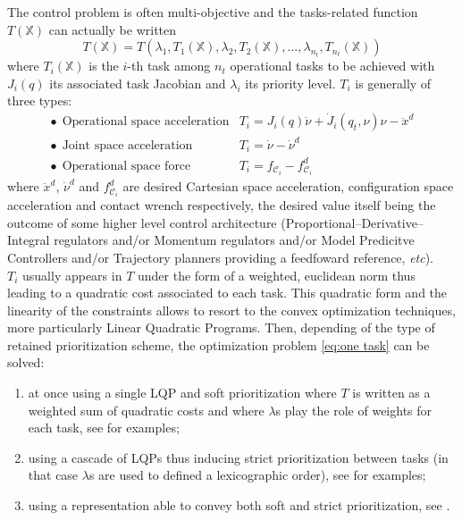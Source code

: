 \documentclass[12pt,a4paper,twoside]{article}
\begin{document}
The control problem is often multi-objective and the tasks-related function $T(\mathbb{X})$ can actually be written
\begin{equation}\label{eq:multi task}
T(\mathbb{X}) = T\left(\lambda_1, T_1(\mathbb{X}), \lambda_2, T_2(\mathbb{X}), \dots, \lambda_{n_t},T_{n_t}(\mathbb{X})\right)
\end{equation}
where $T_i(\mathbb{X})$ is the $i$-th task among $n_t$ operational tasks to be achieved with $J_i(q)$ its associated task Jacobian and $\lambda_i$ its priority level. $T_i$ is generally of three types:
\begin{equation}
\begin{array}{ll}
\bullet~~\text{Operational space acceleration} & T_i={J_i}({q}){\dot{\nu}} + {\dot{J}_i}({q}_t,{\nu}){\nu} -{\ddot{x}}^{d} \\
\bullet~~\text{Joint space acceleration}       & T_i={\dot{\nu}}-{\dot{\nu}}^{d} \\
\bullet~~\text{Operational space force}        & T_i={f}_{\mathcal{C}_i}-{f}_{\mathcal{C}_i}^{d}
\end{array}
\end{equation}
where ${\ddot{x}}^{d}$, ${\dot{\nu}}^{d}$ and ${f}_{\mathcal{C}_i}^{d}$ are desired Cartesian space acceleration, configuration space acceleration and contact wrench respectively, the desired value itself being the outcome of some higher level control architecture (Proportional--Derivative--Integral regulators and/or Momentum regulators and/or Model Predicitve Controllers and/or Trajectory planners providing a feedfoward reference, \textit{etc}).\\

$T_i$ usually appears in $T$ under the form of a weighted, euclidean norm thus leading to a quadratic cost associated to each task. This quadratic form and the linearity of the constraints allows to resort to the convex optimization techniques, more particularly Linear Quadratic Programs. Then, depending of the type of retained prioritization scheme, the optimization problem \ref{eq:one task} can be solved:
\begin{enumerate}
\item at once using a single LQP and soft prioritization where $T$ is written as a weighted sum of quadratic costs and where $\lambda$s play the role of weights for each task, see \cite{Salini2011,bouyarmane2011using} for examples;
\item using a cascade of LQPs thus inducing strict prioritization between tasks (in that case $\lambda$s are used to defined a lexicographic order), see \cite{Saab13,herzog2014balancing,hierarchicalq} for examples;
\item using a representation able to convey both soft and strict prioritization, see \cite{liu-AutRob2015,liu-AutRobSI2015}.
\end{enumerate}
\end{document}
